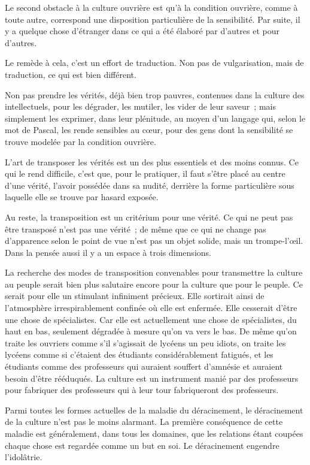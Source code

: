 \documentclass[french,twoside]{book} %
\begin{document}
Le second obstacle à la culture ouvrière est qu'à la condition ouvrière, comme à toute autre, correspond une disposition particulière de la sensibilité. Par suite, il y a quelque chose d'étranger dans ce qui a été élaboré par d'autres et pour d'autres.\par
Le remède à cela, c'est un effort de traduction. Non pas de vulgarisation, mais de traduction, ce qui est bien différent.\par
Non pas prendre les vérités, déjà bien trop pauvres, contenues dans la culture des intellectuels, pour les dégrader, les mutiler, les vider de leur saveur ; mais simplement les exprimer, dans leur plénitude, au moyen d'un langage qui, selon le mot de Pascal, les rende sensibles au cœur, pour des gens dont la sensibilité se trouve modelée par la condition ouvrière.\par
L'art de transposer les vérités est un des plus essentiels et des moins connus. Ce qui le rend difficile, c'est que, pour le pratiquer, il faut s'être placé au centre d'une vérité, l'avoir possédée dans sa nudité, derrière la forme particulière sous laquelle elle se trouve par hasard exposée.\par
Au reste, la transposition est un critérium pour une vérité. Ce qui ne peut pas être transposé n'est pas une vérité ; de même que ce qui ne change pas d'apparence selon le point de vue n'est pas un objet solide, mais un trompe-l'œil. Dans la pensée aussi il y a un espace à trois dimensions.\par
La recherche des modes de transposition convenables pour transmettre la culture au peuple serait bien plus salutaire encore pour la culture que pour le peuple. Ce serait pour elle un stimulant infiniment précieux. Elle sortirait ainsi de l'atmosphère irrespirablement confinée où elle est enfermée. Elle cesserait d'être une chose de spécialistes. Car elle est actuellement une chose de spécialistes, du haut en bas, seulement dégradée à mesure qu'on va vers le bas. De même qu'on traite les ouvriers comme s'il s'agissait de lycéens un peu idiots, on traite les lycéens comme si c'étaient des étudiants considérablement fatigués, et les étudiants comme des professeurs qui auraient souffert d'amnésie et auraient besoin d'être rééduqués. La culture est un instrument manié par des professeurs pour fabriquer des professeurs qui à leur tour fabriqueront des professeurs.\par
Parmi toutes les formes actuelles de la maladie du déracinement, le déracinement de la culture n'est pas le moins alarmant. La première conséquence de cette maladie est généralement, dans tous les domaines, que les relations étant coupées chaque chose est regardée comme un but en soi. Le déracinement engendre l'idolâtrie.\par
\end{document}
